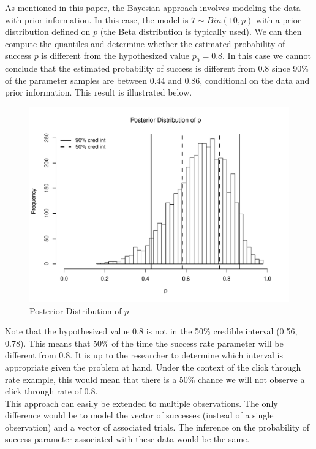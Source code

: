 \documentclass[12pt]{article}
\begin{document}
\noindent As mentioned in this paper, the Bayesian approach involves modeling the data with prior information. In this case, the model is $7 \sim Bin(10, p)$ with a prior distribution defined on $p$ (the Beta distribution is typically used). We can then compute the quantiles and determine whether the estimated probability of success $p$ is different from the hypothesized value $p_0 = 0.8$. In this case we cannot conclude that the estimated probability of success is different from 0.8 since 90\% of the parameter samples are between 0.44 and 0.86, conditional on the data and prior information. This result is illustrated below. \\

\begin{figure}[H]\caption[]{Posterior Distribution of $p$}
\centering
\begin{minipage}{0.6\linewidth}
\includegraphics[trim={0cm 0cm 0cm 1.5cm}, clip, scale=0.6]{../figs/bin1.pdf}
\end{minipage}
\end{figure}

\noindent Note that the hypothesized value 0.8 is not in the 50\% credible interval (0.56, 0.78). This means that 50\% of the time the success rate parameter will be different from 0.8. It is up to the researcher to determine which interval is appropriate given the problem at hand. Under the context of the click through rate example, this would mean that there is a 50\% chance we will not observe a click through rate of 0.8.\\

\noindent This approach can easily be extended to multiple observations. The only difference would be to model the vector of successes (instead of a single observation) and a vector of associated trials. The inference on the probability of success parameter associated with these data would be the same. \\
\end{document}
